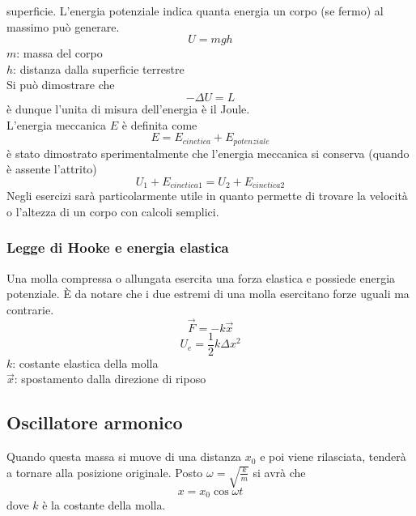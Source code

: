 superficie. L'energia potenziale indica quanta energia un corpo (se fermo) al massimo può generare.
\begin{equation*}
  U = mgh
\end{equation*}
$m$: massa del corpo\\
$h$: distanza dalla superficie terrestre\\ [\baselineskip]
Si può dimostrare che
\begin{equation*}
  -\Delta U = L
\end{equation*}
è dunque l'unita di misura dell'energia è il Joule.\\ [\baselineskip]
L'energia meccanica $E$ è definita come
\begin{equation*}
  E=E_{cinetica}+E_{potenziale}
\end{equation*}
è stato dimostrato sperimentalmente che l'energia meccanica si conserva (quando è assente 
l'attrito)
\begin{equation*}
  U_1 + E_{cinetica1} = U_2 + E_{cinetica2}
\end{equation*}
Negli esercizi sarà particolarmente utile in quanto permette di trovare la velocità o l'altezza di
un corpo con calcoli semplici.\\ [\baselineskip]

\subsubsection{Legge di Hooke e energia elastica}
Una molla compressa o allungata esercita una forza elastica e possiede energia potenziale. È da 
notare che i due estremi di una molla esercitano forze uguali ma contrarie.
\begin{equation*}
  \vec{F} = -k\vec{x}
\end{equation*}
\begin{equation*}
  U_e = \frac{1}{2}k\Delta x^2
\end{equation*}
$k$: costante elastica della molla\\
$\vec{x}$: spostamento dalla direzione di riposo\\[\baselineskip]

\subsection{Oscillatore armonico}
\begin{center}
\end{center}
Quando questa massa si muove di una distanza $x_0$ e poi viene rilasciata, tenderà a tornare alla
posizione originale. Posto $\omega=\sqrt{\frac{k}{m}}$ si avrà che
\begin{equation*}
  x=x_0\cos\omega t
\end{equation*}
dove $k$ è la costante della molla.

